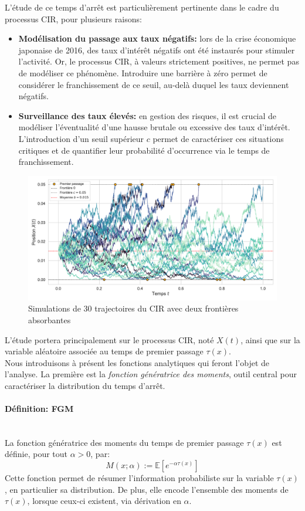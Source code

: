 L'étude de ce temps d'arrêt est particulièrement pertinente dans le cadre du processus \acs{CIR}, pour plusieurs raisons:
\begin{itemize}
    \item \textbf{Modélisation du passage aux taux négatifs:} lors de la crise économique japonaise de 2016, des taux d'intérêt négatifs ont été instaurés pour stimuler l'activité. Or, le processus \acs{CIR}, à valeurs strictement positives, ne permet pas de modéliser ce phénomène. Introduire une barrière à zéro permet de considérer le franchissement de ce seuil, au-delà duquel les taux deviennent négatifs.
    \item \textbf{Surveillance des taux élevés:} en gestion des risques, il est crucial de modéliser l'éventualité d'une hausse brutale ou excessive des taux d'intérêt. L'introduction d'un seuil supérieur $c$ permet de caractériser ces situations critiques et de quantifier leur probabilité d'occurrence via le temps de franchissement.
\end{itemize}
\begin{figure}[htb]
    \centering
    \includegraphics[width=0.9\linewidth]{img/intro/cir_first_passage.pdf}
    \caption{Simulations de 30 trajectoires du \acs{CIR} avec deux frontières absorbantes}\label{fig:FPTCIR}
\end{figure}
\FloatBarrier L'étude portera principalement sur le processus \acs{CIR}, noté $X(t)$, ainsi que sur la variable aléatoire associée au temps de premier passage $\tau(x)$.\\
Nous introduisons à présent les fonctions analytiques qui feront l'objet de l'analyse. La première est la \textit{fonction génératrice des moments}, outil central pour caractériser la distribution du temps d'arrêt.
\paragraph{Définition: \ac{FGM}}\mbox{}\\
La fonction génératrice des moments du temps de premier passage $\tau(x)$ est définie, pour tout $\alpha > 0$, par:
\begin{equation}\label{fgm}
    M(x;\alpha):= \mathds{E} \left[ e^{-\alpha \tau(x)} \right]
\end{equation}
Cette fonction permet de résumer l'information probabiliste sur la variable $\tau(x)$, en particulier sa distribution. De plus, elle encode l'ensemble des moments de $\tau(x)$, lorsque ceux-ci existent, via dérivation en $\alpha$. 

